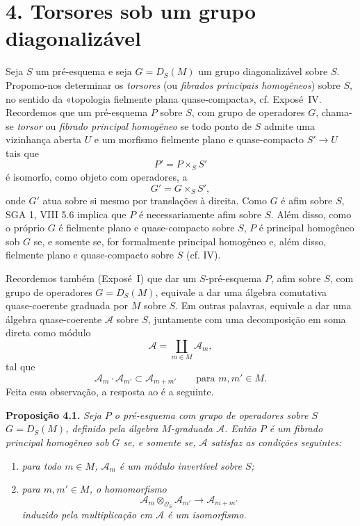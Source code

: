 
\section*{4. Torsores sob um grupo diagonalizável}

Seja \(S\) um pré-esquema e seja
\(G=D_S(M)\) um grupo diagonalizável sobre \(S\). Propomo-nos determinar os \emph{torsores} (ou \emph{fibrados principais
homogêneos}) sobre \(S\), no sentido da «topologia fielmente plana
quase-compacta», cf. Exposé~IV. Recordemos que um pré-esquema
\(P\) sobre \(S\), com grupo de operadores \(G\), chama-se
\emph{torsor} ou \emph{fibrado principal homogêneo} se todo ponto de \(S\)
admite uma vizinhança aberta \(U\) e um morfismo fielmente plano e
quase-compacto \(S'\to U\) tais que
\[
  P'=P\times_SS'
\]
é isomorfo, como objeto com operadores, a
\[
  G'=G\times_SS',
\]
onde \(G'\) atua sobre si mesmo por translações à direita. Como
\(G\) é afim sobre \(S\), SGA 1, VIII 5.6 implica que \(P\) é
necessariamente afim sobre \(S\). Além disso, como o próprio \(G\) é fielmente
plano e quase-compacto sobre \(S\), \(P\) é principal homogêneo sob \(G\)
se, e somente se, for formalmente principal homogêneo e, além disso, fielmente plano e
quase-compacto sobre \(S\) (cf. IV).

Recordemos também
(Exposé~I) que dar um
\(S\)-pré-esquema \(P\), afim sobre \(S\), com grupo de operadores
\(G=D_S(M)\), equivale a dar uma álgebra comutativa quase-coerente
graduada por \(M\) sobre \(S\). Em outras palavras, equivale a dar uma
álgebra quase-coerente \(\mathscr A\) sobre \(S\), juntamente com uma
decomposição em soma direta como módulo
\[
  \mathscr A=\coprod_{m\in M}\mathscr A_m,
\]
tal que
\[
  \mathscr A_m\mathbin{\cdot}\mathscr A_{m'}
  \subset\mathscr A_{m+m'}
  \qquad\text{para }m,m'\in M.
\]
Feita essa observação, a resposta ao
 é a
seguinte.

\medskip
\noindent{}\textbf{Proposição 4.1.}
\textit{Seja \(P\) o pré-esquema com grupo de operadores sobre \(S\)
\(G=D_S(M)\), definido pela álgebra \(M\)-graduada \(\mathscr A\).
Então \(P\) é um fibrado principal homogêneo sob \(G\) se, e somente se,
\(\mathscr A\) satisfaz as condições seguintes:}
\begin{enumerate}
  \item[(a)]
  \textit{para todo \(m\in M\), \(\mathscr A_m\) é um módulo invertível
  sobre \(S\);}

  \item[(b)]
  \textit{para \(m,m'\in M\), o homomorfismo}
  \[
    \mathscr A_m\otimes_{\mathcal O_S}\mathscr A_{m'}
    \longrightarrow\mathscr A_{m+m'}
  \]
  \textit{induzido pela multiplicação em \(\mathscr A\) é um
  isomorfismo.}
\end{enumerate}

